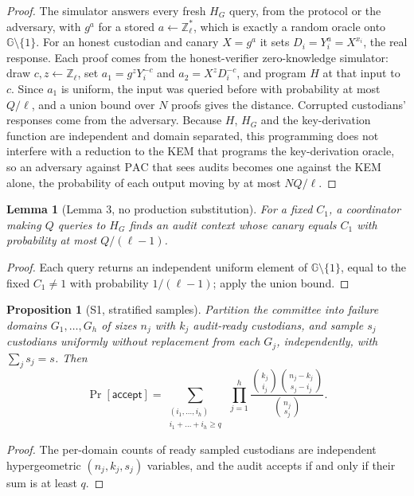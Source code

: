 \documentclass[11pt]{article}
\newtheorem*{lemmaS}{Lemma}
\newtheorem*{propositionS}{Proposition}
\newcommand{\G}{\mathbb{G}}
\newcommand{\Zq}{\mathbb{Z}_\ell}
\newcommand{\PAC}{\mathrm{PAC}}
\begin{document}
\begin{proof}
The simulator answers every fresh $H_G$ query, from the protocol or the adversary, with $g^{a}$ for a stored $a\leftarrow\mathbb{Z}_\ell^{*}$, which is exactly a random oracle onto $\G\setminus\{1\}$. For an honest custodian and canary $X=g^{a}$ it sets $D_i=Y_i^{a}=X^{x_i}$, the real response. Each proof comes from the honest-verifier zero-knowledge simulator: draw $c,z\leftarrow\Zq$, set $a_1=g^{z}Y_i^{-c}$ and $a_2=X^{z}D_i^{-c}$, and program $H$ at that input to $c$. Since $a_1$ is uniform, the input was queried before with probability at most $Q/\ell$, and a union bound over $N$ proofs gives the distance. Corrupted custodians' responses come from the adversary. Because $H$, $H_G$ and the key-derivation function are independent and domain separated, this programming does not interfere with a reduction to the KEM that programs the key-derivation oracle, so an adversary against $\PAC$ that sees audits becomes one against the KEM alone, the probability of each output moving by at most $NQ/\ell$.
\end{proof}

\begin{lemmaS}[Lemma 3, no production substitution]
For a fixed $C_1$, a coordinator making $Q$ queries to $H_G$ finds an audit context whose canary equals $C_1$ with probability at most $Q/(\ell-1)$.
\end{lemmaS}

\begin{proof}
Each query returns an independent uniform element of $\G\setminus\{1\}$, equal to the fixed $C_1\neq1$ with probability $1/(\ell-1)$; apply the union bound.
\end{proof}

\begin{propositionS}[S1, stratified samples]
Partition the committee into failure domains $G_1,\dots,G_h$ of sizes $n_j$ with $k_j$ audit-ready custodians, and sample $s_j$ custodians uniformly without replacement from each $G_j$, independently, with $\sum_j s_j=s$. Then
\[
\Pr[\mathsf{accept}]=\sum_{\substack{(i_1,\dots,i_h)\\ i_1+\dots+i_h\ge q}}\ \prod_{j=1}^{h}\frac{\binom{k_j}{i_j}\binom{n_j-k_j}{s_j-i_j}}{\binom{n_j}{s_j}}.
\]
\end{propositionS}

\begin{proof}
The per-domain counts of ready sampled custodians are independent hypergeometric $(n_j,k_j,s_j)$ variables, and the audit accepts if and only if their sum is at least $q$.
\end{proof}
\end{document}
